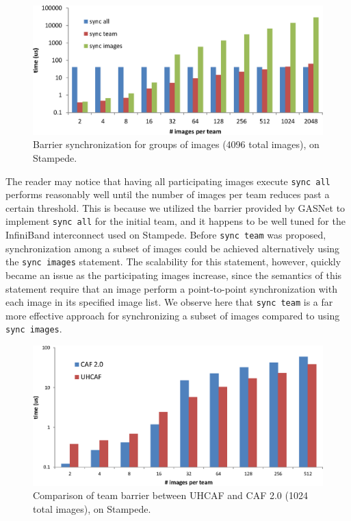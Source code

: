 \begin{figure}[h]
  \centering
  \includegraphics[width=\columnwidth]{figures/stampede-team-barrier-4096.eps}
  \caption{Barrier synchronization for groups of images (4096 total images), on Stampede.}
  \label{fig:stampede-team-barrier}
\end{figure}

The reader may notice that having all participating images execute
\texttt{sync all} performs reasonably well until the number of images per team
reduces past a certain threshold. This is because we utilized the barrier
provided by GASNet to implement \texttt{sync all} for the initial team, and it
happens to be well tuned for the InfiniBand interconnect used on Stampede.
Before \texttt{sync~team} was proposed, synchronization among a subset of
images could be achieved alternatively using the \texttt{sync~images}
statement.  The scalability for this statement, however, quickly became an
issue as the participating images increase, since the semantics of this
statement require that an image perform a point-to-point synchronization with
each image in its specified image list.  We observe here that \texttt{sync team} is
a far more effective approach for synchronizing a subset of images compared to
using \texttt{sync images}.

\begin{figure}[h]
    \centering
    \includegraphics[width=\columnwidth]{figures/team-barrier-stampede-1024.eps}
    \caption{Comparison of team barrier between UHCAF and CAF 2.0 (1024 total
    images), on Stampede.}
    \label{fig:stampede-teambar-caf2}
\end{figure}

